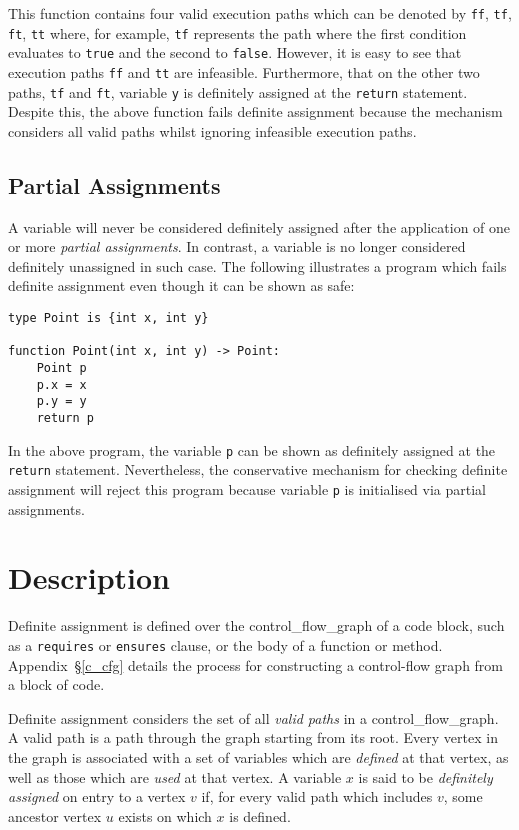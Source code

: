 This function contains four valid execution paths which can be denoted
by \lstinline{ff}, \lstinline{tf}, \lstinline{ft}, \lstinline{tt}
where, for example, \lstinline{tf} represents the path where the first
condition evaluates to \lstinline{true} and the second to
\lstinline{false}.  However, it is easy to see that execution paths
\lstinline{ff} and \lstinline{tt} are infeasible.  Furthermore, that
on the other two paths, \lstinline{tf} and \lstinline{ft}, variable
\lstinline{y} is definitely assigned at the \lstinline{return}
statement.  Despite this, the above function fails definite assignment
because the mechanism considers all valid paths whilst ignoring
infeasible execution paths.

\subsection{Partial Assignments}

A variable will never be considered definitely assigned after the
application of one or more {\em partial assignments}.  In contrast, a
variable is no longer considered definitely unassigned in such case.
The following illustrates a program which fails definite assignment
even though it can be shown as safe:

\begin{lstlisting}
type Point is {int x, int y}

function Point(int x, int y) -> Point:
    Point p
    p.x = x
    p.y = y
    return p
\end{lstlisting}

In the above program, the variable \lstinline{p} can be shown as definitely assigned at the \lstinline{return} statement.  Nevertheless, the conservative mechanism for checking definite assignment will reject this program because variable \lstinline{p} is initialised via partial assignments.  

\section{Description}

Definite assignment is defined over the \gls{control_flow_graph} of a code block, such as a \lstinline{requires} or \lstinline{ensures} clause, or the body of a function or method.  Appendix~\S\ref{c_cfg} details the process for constructing a control-flow graph from a block of code.  

Definite assignment considers the set of all {\em valid paths} in a \gls{control_flow_graph}.  A valid path is a path through the graph starting from its root.  Every vertex in the graph is associated with a set of variables which are {\em defined} at that vertex, as well as those which are {\em used} at that vertex.  A variable $x$ is said to be {\em definitely assigned} on entry to a vertex $v$ if, for every valid path which includes $v$, some ancestor vertex $u$ exists on which $x$ is defined.

